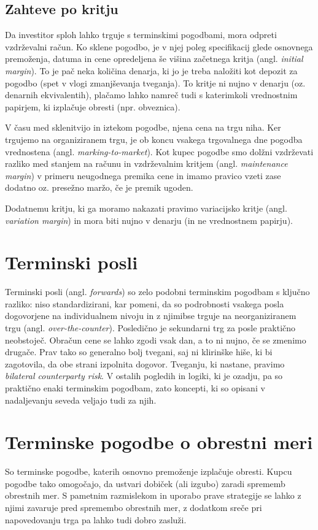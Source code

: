 \documentclass[a4paper]{article}
\begin{document}
\subsection{Zahteve po kritju}
Da investitor sploh lahko trguje s terminskimi pogodbami, mora odpreti vzdrževalni račun. 
Ko sklene pogodbo, je v njej poleg specifikacij glede osnovnega premoženja, datuma in cene 
opredeljena še višina začetnega kritja (angl. \textit{initial margin}). To je pač neka 
količina denarja, ki jo je treba naložiti kot depozit za pogodbo (spet v vlogi zmanjševanja 
tveganja). To kritje ni nujno v denarju (oz. denarnih ekvivalentih), plačamo lahko namreč 
tudi s katerimkoli vrednostnim papirjem, ki izplačuje obresti (npr. obveznica).

V času med sklenitvijo in iztekom pogodbe, njena cena na trgu niha. Ker trgujemo na organiziranem
trgu, je ob koncu vsakega trgovalnega dne pogodba vrednostena (angl. \textit{marking-to-market}). 
Kot kupec pogodbe smo dolžni vzdrževati razliko med stanjem na računu in vzdrževalnim kritjem
(angl. \textit{maintenance margin}) v primeru neugodnega premika cene in imamo pravico vzeti zase 
dodatno oz. presežno maržo, če je premik ugoden. 

Dodatnemu kritju, ki ga moramo nakazati pravimo variacijsko kritje (angl. \textit{variation margin}) 
in mora biti nujno v denarju (in ne vrednostnem papirju). 

\section{Terminski posli}
Terminski posli (angl. \textit{forwards}) so zelo podobni terminskim pogodbam s ključno razliko:
niso standardizirani, kar pomeni, da so podrobnosti vsakega posla dogovorjene na individualnem nivoju 
in z njimibse trguje na neorganiziranem trgu (angl. \textit{over-the-counter}). Posledično je sekundarni 
trg za posle praktično neobstoječ. Obračun cene se lahko zgodi vsak dan, a to ni nujno, če se zmenimo 
drugače. Prav tako so generalno bolj tvegani, saj ni klirinške hiše, ki bi zagotovila, da obe strani 
izpolnita dogovor. Tveganju, ki nastane, pravimo \textit{bilateral counterparty risk}. V ostalih pogledih
in logiki, ki je ozadju, pa so praktično enaki terminskim pogodbam, zato koncepti, ki so opisani v 
nadaljevanju seveda veljajo tudi za njih.

\section{Terminske pogodbe o obrestni meri}
So terminske pogodbe, katerih osnovno premoženje izplačuje obresti. Kupcu pogodbe tako omogočajo, da 
ustvari dobiček (ali izgubo) zaradi sprememb obrestnih mer. S pametnim razmislekom in uporabo prave 
strategije se lahko z njimi zavaruje pred spremembo obrestnih mer, z dodatkom sreče pri napovedovanju
trga pa lahko tudi dobro zasluži.
\end{document}
